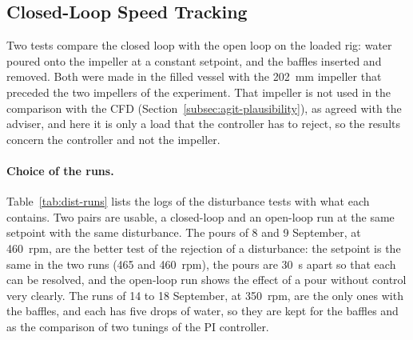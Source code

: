 \subsection{Closed-Loop Speed Tracking}
\label{subsec:agit-pi-test}

Two tests compare the closed loop with the open loop on the loaded rig: water poured onto the impeller at a constant setpoint, and the baffles inserted and removed. Both were made in the filled vessel with the 202~mm impeller that preceded the two impellers of the experiment. That impeller is not used in the comparison with the CFD (Section~\ref{subsec:agit-plausibility}), as agreed with the adviser, and here it is only a load that the controller has to reject, so the results concern the controller and not the impeller.

\paragraph{Choice of the runs.}
Table~\ref{tab:dist-runs} lists the logs of the disturbance tests with what each contains. Two pairs are usable, a closed-loop and an open-loop run at the same setpoint with the same disturbance. The pours of 8 and 9 September, at 460~rpm, are the better test of the rejection of a disturbance: the setpoint is the same in the two runs (465 and 460~rpm), the pours are 30~s apart so that each can be resolved, and the open-loop run shows the effect of a pour without control very clearly. The runs of 14 to 18 September, at 350~rpm, are the only ones with the baffles, and each has five drops of water, so they are kept for the baffles and as the comparison of two tunings of the PI controller.

